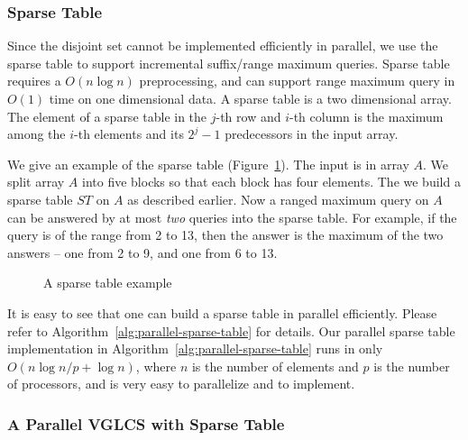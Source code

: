 \subsubsection{Sparse Table}

Since the disjoint set cannot be implemented efficiently in parallel,
we use the sparse table to support incremental suffix/range maximum
queries.  Sparse table~\cite{Berkman1993RecursiveSP} requires a $O(n
\log n)$ preprocessing, and can support range maximum query in $O(1)$
time on one dimensional data.  A sparse table is a two dimensional
array.  The element of a sparse table in the $j$-th row and $i$-th
column is the maximum among the $i$-th elements and its $2^j - 1$
predecessors in the input array.

We give an example of the sparse table
(Figure~\ref{fig:interval-decomposition}).  The input is in array
$A$. We split array $A$ into five blocks so that each block has four
elements.  The we build a sparse table $ST$ on $A$ as described
earlier.  Now a ranged maximum query on $A$ can be answered by at most
{\em two} queries into the sparse table.  For example, if the query is
of the range from 2 to 13, then the answer is the maximum of the two
answers -- one from 2 to 9, and one from 6 to 13.

\begin{figure}[!thb]
  \centering {} 
  \caption{A sparse table example}
  \label{fig:interval-decomposition}
\end{figure}

It is easy to see that one can build a sparse table in parallel
efficiently.  Please refer to
Algorithm~\ref{alg:parallel-sparse-table} for details.  Our parallel
sparse table implementation in
Algorithm~\ref{alg:parallel-sparse-table} runs in only $O(n \log n / p
+ \log n)$, where $n$ is the number of elements and $p$ is the number
of processors, and is very easy to parallelize and to implement.



\subsubsection{A Parallel VGLCS with Sparse Table}

